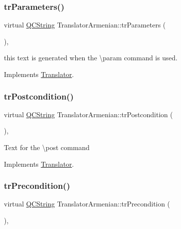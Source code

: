 \subsubsection{\texorpdfstring{trParameters()}{trParameters()}}
{\footnotesize\ttfamily virtual \mbox{\hyperlink{class_q_c_string}{Q\+C\+String}} Translator\+Armenian\+::tr\+Parameters (\begin{DoxyParamCaption}{ }\end{DoxyParamCaption})\hspace{0.3cm}{\ttfamily [inline]}, {\ttfamily [virtual]}}

this text is generated when the \textbackslash{}param command is used. 

Implements \mbox{\hyperlink{class_translator}{Translator}}.

\mbox{\label{class_translator_armenian_a44743eb5663e5ab3ea31cb7af35a9431}} 
\subsubsection{\texorpdfstring{trPostcondition()}{trPostcondition()}}
{\footnotesize\ttfamily virtual \mbox{\hyperlink{class_q_c_string}{Q\+C\+String}} Translator\+Armenian\+::tr\+Postcondition (\begin{DoxyParamCaption}{ }\end{DoxyParamCaption})\hspace{0.3cm}{\ttfamily [inline]}, {\ttfamily [virtual]}}

Text for the \textbackslash{}post command 

Implements \mbox{\hyperlink{class_translator}{Translator}}.

\mbox{\label{class_translator_armenian_ae760be83553a16efd376aac28ac7d8ed}} 
\subsubsection{\texorpdfstring{trPrecondition()}{trPrecondition()}}
{\footnotesize\ttfamily virtual \mbox{\hyperlink{class_q_c_string}{Q\+C\+String}} Translator\+Armenian\+::tr\+Precondition (\begin{DoxyParamCaption}{ }\end{DoxyParamCaption})\hspace{0.3cm}{\ttfamily [inline]}, {\ttfamily [virtual]}}

